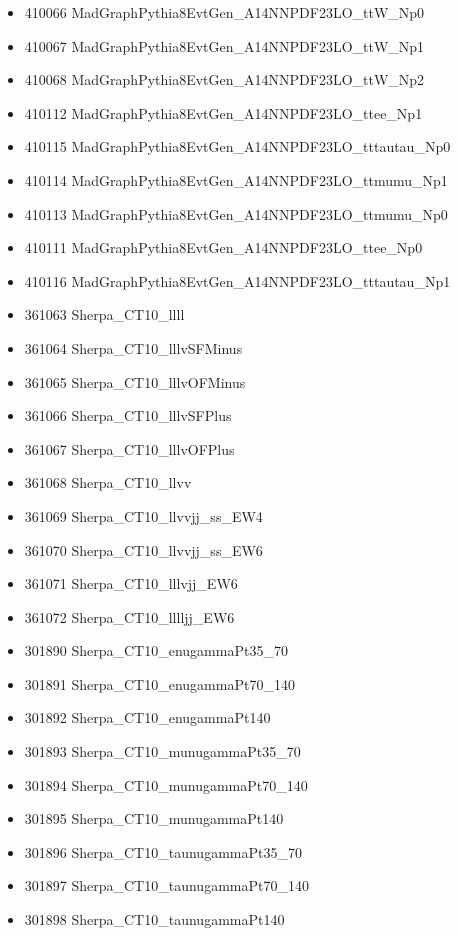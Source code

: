 \begin{itemize}
\item 410066	MadGraphPythia8EvtGen\_A14NNPDF23LO\_ttW\_Np0
\item 410067	MadGraphPythia8EvtGen\_A14NNPDF23LO\_ttW\_Np1
\item 410068	MadGraphPythia8EvtGen\_A14NNPDF23LO\_ttW\_Np2
\item 410112	MadGraphPythia8EvtGen\_A14NNPDF23LO\_ttee\_Np1
\item 410115	MadGraphPythia8EvtGen\_A14NNPDF23LO\_tttautau\_Np0
\item 410114	MadGraphPythia8EvtGen\_A14NNPDF23LO\_ttmumu\_Np1
\item 410113	MadGraphPythia8EvtGen\_A14NNPDF23LO\_ttmumu\_Np0
\item 410111	MadGraphPythia8EvtGen\_A14NNPDF23LO\_ttee\_Np0
\item 410116	MadGraphPythia8EvtGen\_A14NNPDF23LO\_tttautau\_Np1
\item 361063	Sherpa\_CT10\_llll
\item 361064	Sherpa\_CT10\_lllvSFMinus
\item 361065	Sherpa\_CT10\_lllvOFMinus
\item 361066	Sherpa\_CT10\_lllvSFPlus
\item 361067	Sherpa\_CT10\_lllvOFPlus
\item 361068	Sherpa\_CT10\_llvv
\item 361069	Sherpa\_CT10\_llvvjj\_ss\_EW4
\item 361070	Sherpa\_CT10\_llvvjj\_ss\_EW6
\item 361071	Sherpa\_CT10\_lllvjj\_EW6
\item 361072	Sherpa\_CT10\_lllljj\_EW6
\item 301890	Sherpa\_CT10\_enugammaPt35\_70
\item 301891	Sherpa\_CT10\_enugammaPt70\_140
\item 301892	Sherpa\_CT10\_enugammaPt140
\item 301893	Sherpa\_CT10\_munugammaPt35\_70
\item 301894	Sherpa\_CT10\_munugammaPt70\_140
\item 301895	Sherpa\_CT10\_munugammaPt140
\item 301896	Sherpa\_CT10\_taunugammaPt35\_70
\item 301897	Sherpa\_CT10\_taunugammaPt70\_140
\item 301898	Sherpa\_CT10\_taunugammaPt140
\end{itemize}

